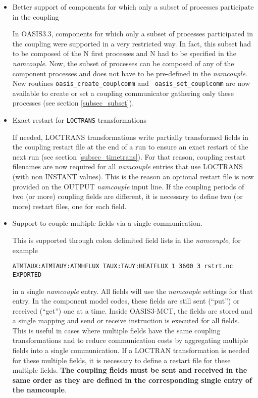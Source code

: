 \begin{itemize}

\item Better support of components for which only a subset of processes
  participate in the coupling

In OASIS3.3, components for which only a subset of processes
  participated in the coupling were supported in a very restricted
  way. In fact, this subset had to be composed of the N first
  processes and N had to be specified in the {\it namcouple}. Now, the
  subset of processes can be composed of any of the component
  processes and does not have to be pre-defined in the {\it
    namcouple}. New routines {\tt oasis\_create\_couplcomm} and {\tt
  oasis\_set\_couplcomm} are now available to create or set a coupling
  communicator gathering only these processes (see section \ref{subsec_subset}).

\item Exact restart for {\tt LOCTRANS} transformations

If needed, LOCTRANS transformations write partially
  transformed fields  in the coupling restart file at the end of a run
  to ensure an exact restart of the next run (see section
  \ref{subsec_timetrans}). For that
  reason, coupling restart filenames are now required for all {\it
    namcouple} entries that use LOCTRANS (with non INSTANT
  values). This is the reason an optional restart file is now provided
  on the OUTPUT {\it namcouple} input line. If the coupling periods of
  two (or more) coupling fields are different, it is necessary to define 
  two (or more) restart files, one for each field.

\item Support to couple multiple fields via a single communication.

 This is supported through colon
delimited field lists in the {\it namcouple}, for example 

{\tt ATMTAUX:ATMTAUY:ATMHFLUX  TAUX:TAUY:HEATFLUX 1 3600 3 rstrt.nc EXPORTED}

 in a single {\it namcouple} entry. All fields will use the
{\it namcouple} settings for that entry. In the component model codes,
these fields are still sent (``put'') or received (``get'') one at a
time. Inside OASIS3-MCT, the fields are stored and a single mapping
and send or receive instruction is executed for all fields. This is
useful in cases where multiple fields have the same coupling
transformations and to reduce communication costs by aggregating multiple 
fields into a single communication. If a LOCTRAN transformation is needed
for these multiple fields, it is necessary to define a restart file for 
these multiple fields. {\bf The coupling fields must be sent and received in the same order 
as they are defined in the corresponding single entry of the namcouple}.


\end{itemize}

